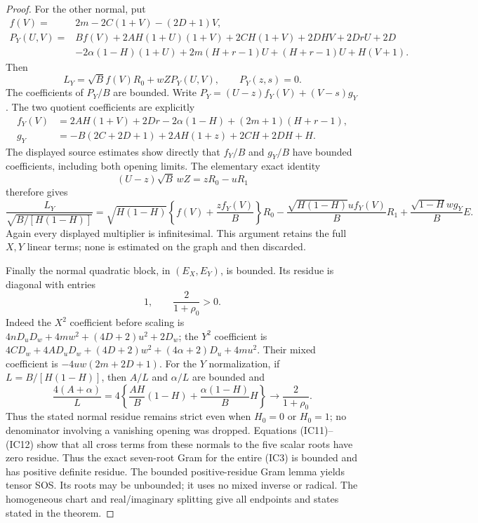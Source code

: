 \begin{proof}
For the other normal, put
\begin{align*}
 f(V)={}&2m-2C(1+V)-(2D+1)V,\\
 P_Y(U,V)={}&Bf(V)+2AH(1+U)(1+V)+2CH(1+V)
       +2DHV+2DrU+2D\\
 &-2\alpha(1-H)(1+U)+2m(H+r-1)U
       +(H+r-1)U+H(V+1).
\end{align*}
Then
\[
 L_Y=\sqrt B f(V)R_0+wZP_Y(U,V),\qquad P_Y(z,s)=0.
\]
The coefficients of $P_Y/B$ are bounded. Write
$P_Y=(U-z)f_Y(V)+(V-s)g_Y$. The two quotient coefficients are explicitly
\begin{align*}
 f_Y(V)&=2AH(1+V)+2Dr-2\alpha(1-H)
                   +(2m+1)(H+r-1),\\
 g_Y&=-B(2C+2D+1)+2AH(1+z)+2CH+2DH+H.
\end{align*}
The displayed source estimates show directly that $f_Y/B$ and
$g_Y/B$ have bounded coefficients, including both opening limits.
The elementary exact identity
\[
          (U-z)\sqrt B\,wZ=zR_0-uR_1
\]
therefore gives
\[
 \frac{L_Y}{\sqrt{B/[H(1-H)]}}
 =\sqrt{H(1-H)}\left\{f(V)+\frac{z f_Y(V)}B\right\}R_0
       -\frac{\sqrt{H(1-H)}u f_Y(V)}B R_1
       +\frac{\sqrt{1-H}w g_Y}B E.          \tag{IC12}
\]
Again every displayed multiplier is infinitesimal. This argument
retains the full $X,Y$ linear terms; none is estimated on the graph
and then discarded.

Finally the normal quadratic block, in $(E_X,E_Y)$, is bounded.
Its residue is diagonal with entries
\[
             1,\qquad \frac2{1+\rho_0}>0.
\]
Indeed the $X^2$ coefficient before scaling is
$4nD_uD_w+4mw^2+(4D+2)u^2+2D_w$; the $Y^2$ coefficient is
$4CD_w+4AD_uD_w+(4D+2)w^2+(4\alpha+2)D_u+4mu^2$.
Their mixed coefficient is $-4uw(2m+2D+1)$.
For the $Y$ normalization, if $L=B/[H(1-H)]$, then $A/L$ and
$\alpha/L$ are bounded and
\[
 \frac{4(A+\alpha)}L
 =4\left\{\frac{AH}B(1-H)
               +\frac{\alpha(1-H)}B H\right\}
 \longrightarrow\frac2{1+\rho_0}.
\]
Thus the stated normal residue remains strict even when $H_0=0$
or $H_0=1$; no denominator involving a vanishing opening was dropped.
Equations (IC11)--(IC12) show that all cross terms from these normals
to the five scalar roots have zero residue. Thus the exact seven-root
Gram for the entire (IC3) is bounded and has positive definite
residue. The bounded positive-residue Gram lemma yields tensor SOS.
Its roots may be unbounded; it uses no mixed inverse or radical.
The homogeneous chart and real/imaginary splitting give all endpoints
and states stated in the theorem.
\end{proof}

